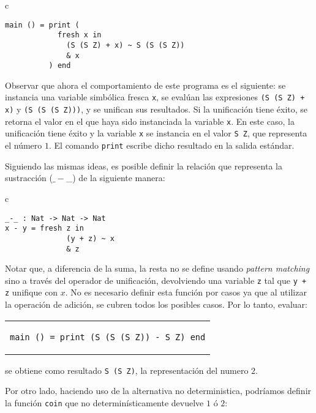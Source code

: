 \begin{center}
\begin{tabular}{c}
\begin{lstlisting}[mathescape=true]
main () = print (
            fresh x in
              (S (S Z) + x) ~ S (S (S Z))
              & x
          ) end
\end{lstlisting}
\end{tabular}
\end{center}
Observar que ahora el comportamiento de este programa es el siguiente:
se instancia una variable simbólica fresca \verb|x|,
se evalúan las expresiones \verb|(S (S Z) + x)| y \verb|(S (S (S Z)))|,
y se unifican sus resultados.
Si la unificación tiene éxito, se retorna el valor en el que haya sido
instanciada la variable \verb|x|.
En este caso, la unificación tiene éxito y la variable \verb|x| se instancia
en el valor \verb|S Z|, que representa el número $1$.
El comando \verb|print| escribe dicho resultado en la salida estándar.

Siguiendo las mismas ideas,
es posible definir la relación que representa la sustracción ($\_-$\_) de la siguiente manera:

\begin{center}
\begin{tabular}{c}
\begin{lstlisting}[mathescape=true]
_-_ : Nat -> Nat -> Nat
x - y = fresh z in
              (y + z) ~ x
              & z
\end{lstlisting}
\end{tabular}
\end{center}
Notar que, a diferencia de la suma, la resta no se define usando {\em pattern matching}
sino a través del operador de unificación, devolviendo una variable \verb|z|
tal que \verb|y + z| unifique con $x$.
No es necesario definir esta función por casos ya que al utilizar la
operación de adición, se cubren todos los posibles casos. Por lo tanto, evaluar:

\begin{center}
\begin{tabular}{c}
\begin{lstlisting}[mathescape=true]
main () = print (S (S (S Z)) - S Z) end
\end{lstlisting}
\end{tabular}
\end{center}
se obtiene como resultado \verb|S (S Z)|, la representación del numero $2$.
\bigskip

Por otro lado, haciendo uso de la alternativa no deterministica,
podríamos definir la función \verb|coin| que no determinísticamente
devuelve $1$ ó $2$:\\

